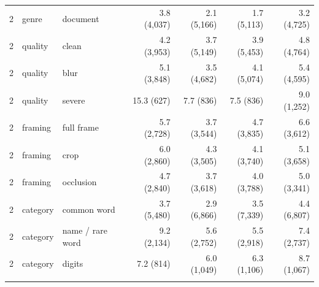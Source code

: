 \documentclass[pdflatex,sn-mathphys-num]{sn-jnl}%
\theoremstyle{thmstyleone}%
\theoremstyle{thmstyletwo}%
\theoremstyle{thmstylethree}%
\begin{document}
\begin{appendices}
\begin{table}[!tbp]
\begin{tabular*}{\textwidth}{@{\extracolsep\fill}lllrrrr}
2 & genre & document & 3.8 (4{,}037) & 2.1 (5{,}166) & 1.7 (5{,}113) & 3.2 (4{,}725) \\
2 & quality & clean & 4.2 (3{,}953) & 3.7 (5{,}149) & 3.9 (5{,}453) & 4.8 (4{,}764) \\
2 & quality & blur & 5.1 (3{,}848) & 3.5 (4{,}682) & 4.1 (5{,}074) & 5.4 (4{,}595) \\
2 & quality & severe & 15.3 (627) & 7.7 (836) & 7.5 (836) & 9.0 (1{,}252) \\
2 & framing & full frame & 5.7 (2{,}728) & 3.7 (3{,}544) & 4.7 (3{,}835) & 6.6 (3{,}612) \\
2 & framing & crop & 6.0 (2{,}860) & 4.3 (3{,}505) & 4.1 (3{,}740) & 5.1 (3{,}658) \\
2 & framing & occlusion & 4.7 (2{,}840) & 3.7 (3{,}618) & 4.0 (3{,}788) & 5.0 (3{,}341) \\
2 & category & common word & 3.7 (5{,}480) & 2.9 (6{,}866) & 3.5 (7{,}339) & 4.4 (6{,}807) \\
2 & category & name / rare word & 9.2 (2{,}134) & 5.6 (2{,}752) & 5.5 (2{,}918) & 7.4 (2{,}737) \\
2 & category & digits & 7.2 (814) & 6.0 (1{,}049) & 6.3 (1{,}106) & 8.7 (1{,}067) \\
\botrule
\end{tabular*}
\end{table}

\end{appendices}


\end{document}
